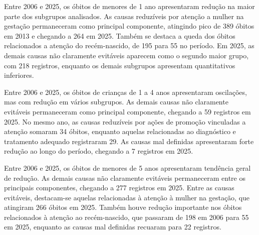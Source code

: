 
Entre 2006 e 2025, os óbitos de menores de 1 ano apresentaram redução na maior parte dos subgrupos analisados. As causas reduzíveis por atenção a mulher na gestação permaneceram como principal componente, atingindo pico de 389 óbitos em 2013 e chegando a 264 em 2025. Também se destaca a queda dos óbitos relacionados a atenção do recém-nascido, de 195 para 55 no período. Em 2025, as demais causas não claramente evitáveis aparecem como o segundo maior grupo, com 218 registros, enquanto os demais subgrupos apresentam quantitativos inferiores.


Entre 2006 e 2025, os óbitos de crianças de 1 a 4 anos apresentaram oscilações, mas com redução em vários subgrupos. As demais causas não claramente evitáveis permaneceram como principal componente, chegando a 59 registros em 2025. No mesmo ano, as causas reduzíveis por ações de promoção vinculadas a atenção somaram 34 óbitos, enquanto aquelas relacionadas ao diagnóstico e tratamento adequado registraram 29. As causas mal definidas apresentaram forte redução ao longo do período, chegando a 7 registros em 2025.


Entre 2006 e 2025, os óbitos de menores de 5 anos apresentaram tendência geral de redução. As demais causas não claramente evitáveis permaneceram entre os principais componentes, chegando a 277 registros em 2025. Entre as causas evitáveis, destacam-se aquelas relacionadas à atenção à mulher na gestação, que atingiram 266 óbitos em 2025. Também houve redução importante nos óbitos relacionados à atenção ao recém-nascido, que passaram de 198 em 2006 para 55 em 2025, enquanto as causas mal definidas recuaram para 22 registros.

